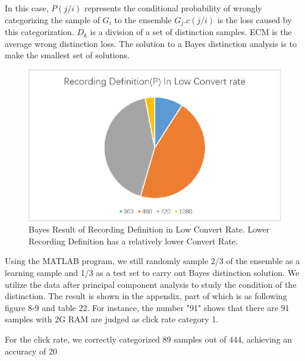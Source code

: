 In this case, $P ( j / i )$ represents the conditional probability of wrongly categorizing the sample of $G _ { i }$ to the ensemble $G _ { j }$.$c ( j / i )$ is the loss caused by this categorization. $D _ { k}$ is a division of a set of distinction samples. ECM is the average wrong distinction loss. The solution to a Bayes distinction analysis is to make the smallest set of solutions.

\begin{figure}[!ht]
	\centering
	\includegraphics[width=360pt]{fig8.eps}
	\caption{Bayes Result of Recording Definition in Low Convert Rate. Lower Recording Definition has a relatively lower Convert Rate. }
	\label{fig8}
\end{figure}

Using the MATLAB program, we still randomly sample 2/3 of the ensemble as a learning sample and 1/3 as a test set to carry out Bayes distinction solution. We utilize the data after principal component analysis to study the condition of the distinction. 
The result is shown in the appendix, part of which is as following figure 8-9 and table 22. For instance, the number "91" shows that there are 91 samples with 2G RAM are judged as click rate category 1. 

For the click rate, we correctly categorized 89 samples out of 444, achieving an accuracy of 20%


